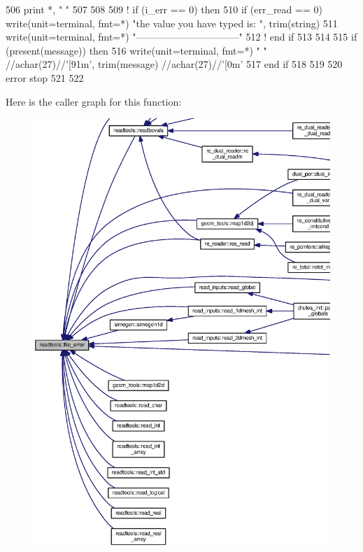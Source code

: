 \begin{DoxyCode}
506       print *, \textcolor{stringliteral}{"  "}
507       
508 
509 \textcolor{comment}{!       if (i\_err == 0) then }
510         \textcolor{keywordflow}{if} (err\_read == 0) \textcolor{keyword}{write}(unit=terminal, fmt=*) \textcolor{stringliteral}{"the value you have typed is: "}\textcolor{comment}{, trim(string)}
511 \textcolor{comment}{        }\textcolor{keyword}{write}(unit=terminal, fmt=*) \textcolor{stringliteral}{"--------------------------------"}
512 \textcolor{comment}{!       end if}
513       
514       
515       \textcolor{keywordflow}{if} (\textcolor{keyword}{present}(message)) \textcolor{keywordflow}{then}
516         \textcolor{keyword}{write}(unit=terminal, fmt=*) \textcolor{stringliteral}{" "} //achar(27)//\textcolor{stringliteral}{'[91m'}, trim(message) //achar\textcolor{comment}{(27)//}\textcolor{stringliteral}{'[0m'}
517 \textcolor{keywordflow}{      end if}
518         
519       
520       error stop
521 
522 
\end{DoxyCode}


Here is the caller graph for this function\+:
\nopagebreak
\begin{figure}[H]
\begin{center}
\leavevmode
\includegraphics[width=350pt]{namespacereadtools_a9481f44f055c2f4bc518a4b91db43b5c_icgraph}
\end{center}
\end{figure}


